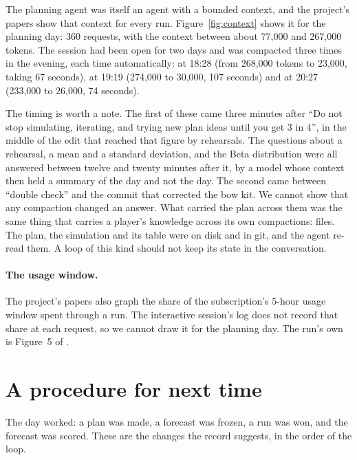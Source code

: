 \documentclass[11pt,a4paper]{article}
\begin{document}
The planning agent was itself an agent with a bounded context, and the project's papers show that context for every run. Figure~\ref{fig:context} shows it for the planning day: 360 requests, with the context between about 77,000 and 267,000 tokens. The session had been open for two days and was compacted three times in the evening, each time automatically: at 18:28 (from 268,000 tokens to 23,000, taking 67 seconds), at 19:19 (274,000 to 30,000, 107 seconds) and at 20:27 (233,000 to 26,000, 74 seconds).

The timing is worth a note. The first of these came three minutes after ``Do not stop simulating, iterating, and trying new plan ideas until you get 3 in 4'', in the middle of the edit that reached that figure by rehearsals. The questions about a rehearsal, a mean and a standard deviation, and the Beta distribution were all answered between twelve and twenty minutes after it, by a model whose context then held a summary of the day and not the day. The second came between ``double check'' and the commit that corrected the bow kit. We cannot show that any compaction changed an answer. What carried the plan across them was the same thing that carries a player's knowledge across its own compactions: files. The plan, the simulation and its table were on disk and in git, and the agent re-read them. A loop of this kind should not keep its state in the conversation.

\paragraph{The usage window.} The project's papers also graph the share of the subscription's 5-hour usage window spent through a run. The interactive session's log does not record that share at each request, so we cannot draw it for the planning day. The run's own is Figure~5 of \citet{batsuk2026fifth}.

\section{A procedure for next time}
\label{sec:protocol}

The day worked: a plan was made, a forecast was frozen, a run was won, and the forecast was scored. These are the changes the record suggests, in the order of the loop.
\end{document}
